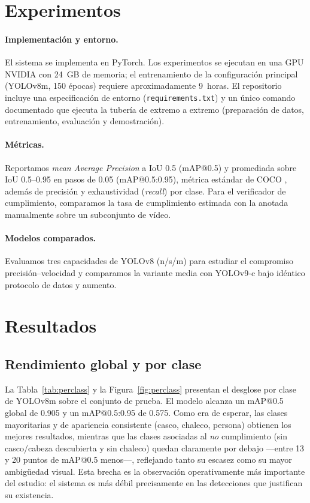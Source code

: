 \documentclass{article}
\begin{document}
\section{Experimentos}

\paragraph{Implementación y entorno.} El sistema se implementa en PyTorch.
Los experimentos se ejecutan en una GPU NVIDIA con 24~GB de memoria; el
entrenamiento de la configuración principal (YOLOv8m, 150 épocas) requiere
aproximadamente 9~horas. El repositorio incluye una especificación de entorno
(\texttt{requirements.txt}) y un único comando documentado que ejecuta la
tubería de extremo a extremo (preparación de datos, entrenamiento, evaluación y
demostración).

\paragraph{Métricas.} Reportamos \emph{mean Average Precision} a IoU 0.5
(mAP@0.5) y promediada sobre IoU 0.5--0.95 en pasos de 0.05 (mAP@0.5:0.95),
métrica estándar de COCO \citep{lin2014coco}, además de precisión y exhaustividad
(\emph{recall}) por clase. Para el verificador de cumplimiento, comparamos la
tasa de cumplimiento estimada con la anotada manualmente sobre un subconjunto de
vídeo.

\paragraph{Modelos comparados.} Evaluamos tres capacidades de YOLOv8 (n/s/m)
para estudiar el compromiso precisión--velocidad y comparamos la variante media
con YOLOv9-c \citep{wang2024yolov9} bajo idéntico protocolo de datos y aumento.

\section{Resultados}
\label{sec:results}

\subsection{Rendimiento global y por clase}
La Tabla~\ref{tab:perclass} y la Figura~\ref{fig:perclass} presentan el
desglose por clase de YOLOv8m sobre el conjunto de prueba. El modelo alcanza un
mAP@0.5 global de 0.905 y un mAP@0.5:0.95 de 0.575. Como era de esperar, las
clases mayoritarias y de apariencia consistente (\textsf{casco}, \textsf{chaleco},
\textsf{persona}) obtienen los mejores resultados, mientras que las clases
asociadas al \emph{no} cumplimiento (\textsf{sin casco}/cabeza descubierta y
\textsf{sin chaleco}) quedan claramente por debajo —entre 13 y 20 puntos de
mAP@0.5 menos—, reflejando tanto su escasez como su mayor ambigüedad visual.
Esta brecha es la observación operativamente más importante del estudio: el
sistema es más débil precisamente en las detecciones que justifican su
existencia.
\end{document}
